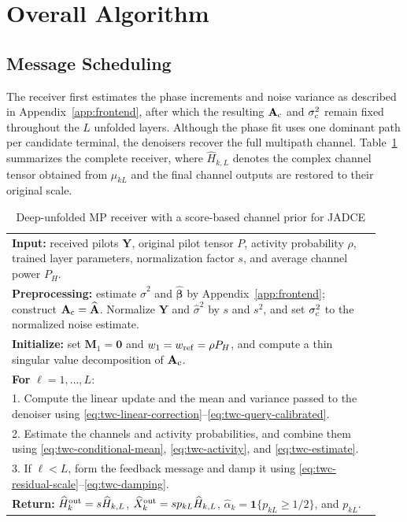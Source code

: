 \section{Overall Algorithm}
\label{sec:overall}

\subsection{Message Scheduling}

The receiver first estimates the phase increments and noise variance
as described in Appendix~\ref{app:frontend}, after which the resulting
$\mathbf A_{\rm c}$ and $\sigma_{\rm c}^2$ remain fixed throughout
the $L$ unfolded layers. Although the phase fit uses one dominant
path per candidate terminal, the denoisers recover the full multipath
channel. Table~\ref{tab:twc-algorithm} summarizes the complete receiver,
where $\widehat H_{k,L}$ denotes the complex channel tensor obtained
from $\mu_{kL}$ and the final channel outputs are restored to their
original scale.

\begin{table}[t]
\centering
\caption{Deep-unfolded MP receiver with a score-based channel prior for JADCE}
\label{tab:twc-algorithm}
\begin{tabular}{p{0.93\linewidth}}
\toprule
\textbf{Input:} received pilots $\mathbf Y$, original pilot tensor $P$,
activity probability $\rho$, trained layer parameters, normalization
factor $s$, and average channel power $P_H$.\\
\textbf{Preprocessing:} estimate $\widehat\sigma^2$ and
$\widehat{\bm\beta}$ by Appendix~\ref{app:frontend}; construct
$\mathbf A_{\rm c}=\widehat{\mathbf A}$.
Normalize $\mathbf Y$ and $\widehat\sigma^2$ by $s$ and $s^2$,
and set $\sigma_{\rm c}^2$ to the normalized noise estimate.\\
\textbf{Initialize:} set $\mathbf M_1=\mathbf0$ and
$w_1=w_{\rm ref}=\rho P_H$, and compute a thin singular value
decomposition of $\mathbf A_{\rm c}$.\\
\textbf{For} $\ell=1,\ldots,L$:\\
1. Compute the linear update and the mean and variance passed to the denoiser using
\eqref{eq:twc-linear-correction}--\eqref{eq:twc-query-calibrated}.\\
2. Estimate the channels and activity probabilities, and combine
them using \eqref{eq:twc-conditional-mean}, \eqref{eq:twc-activity},
and \eqref{eq:twc-estimate}.\\
3. If $\ell<L$, form the feedback message and damp it using
\eqref{eq:twc-residual-scale}--\eqref{eq:twc-damping}.\\
\textbf{Return:} $\widehat H_k^{\rm out}=s\widehat H_{k,L}$,
$\widehat X_k^{\rm out}=s p_{kL}\widehat H_{k,L}$,
$\widehat\alpha_k=\mathbf1\{p_{kL}\geq1/2\}$, and $p_{kL}$.\\
\bottomrule
\end{tabular}
\end{table}

